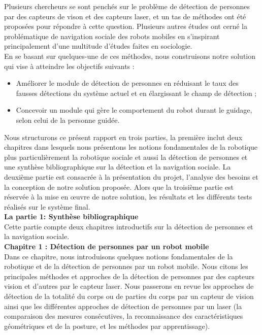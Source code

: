 \tab Plusieurs chercheurs se sont penchés sur le problème de détection de personnes par des capteurs de vison et des capteurs laser, et un tas de méthodes ont été proposées pour répondre à cette question. Plusieurs autres études ont cerné la problématique de navigation sociale des robots mobiles en s'inspirant principalement d'une multitude d'études faites en sociologie.\vspace{5px}\\
\tab En se basant sur quelques-une de ces méthodes, nous construisons notre solution qui vise à atteindre les objectifs suivants :\vspace{5px} 
\begin{itemize}
	\item Améliorer le module de détection de personnes en réduisant le taux des fausses détections du système actuel et en élargissant le champ de détection ;
	\item Concevoir un module qui gère le comportement du robot durant le guidage, selon celui de la personne guidée.\vspace{5px}\\ 
\end{itemize}
\tab Nous structurons ce présent rapport en trois parties, la première inclut deux chapitres dans lesquels nous présentons les notions fondamentales de la robotique plus particulièrement la robotique sociale et aussi la détection de personnes et une synthèse bibliographique sur la détection et la navigation sociale. La deuxième partie est consacrée à la présentation du projet, l'analyse des besoins et la conception de notre solution proposée. Alors que la troisième partie est réservée à la mise en œuvre de notre solution, les résultats et les différents tests réalisés sur le système final.\vspace{5px}\\
{\Large \textbf{La partie 1: Synthèse bibliographique}}\vspace{5px}\\
\tab Cette partie compte deux chapitres introductifs sur la détection de personnes et la navigation sociale.\vspace{5px}\\
\textbf{Chapitre 1 : Détection de personnes par un robot mobile} \vspace{5px}\\
\tab Dans ce chapitre, nous introduisons quelques notions fondamentales de la robotique et de la détection de personnes par un robot mobile. Nous citons les principales méthodes et approches de la détection de personnes par des capteurs vision et d'autres par le capteur laser. Nous passerons en revue les approches de détection de la totalité du corps ou de parties du corps par un capteur de vision ainsi que les différentes approches de détection de personnes par un laser (la comparaison des mesures consécutives, la reconnaissance des caractéristiques géométriques et de la posture, et les méthodes par apprentissage).\vspace{5px}\\
